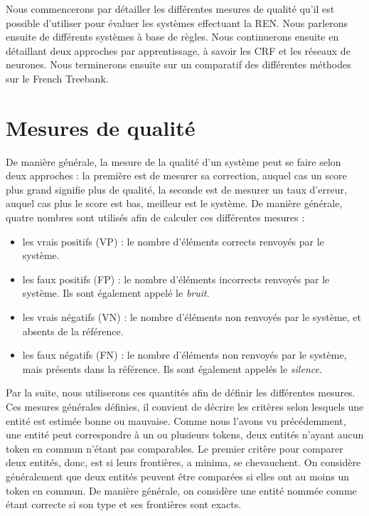 \documentclass[12pt,a4paper,times,twoside,openright]{report}
\begin{document}
Nous commencerons par détailler les différentes mesures de qualité qu'il est possible d'utiliser pour évaluer les systèmes effectuant la REN. Nous parlerons ensuite de différents systèmes à base de règles. Nous continuerons ensuite en détaillant deux approches par apprentissage, à savoir les CRF et les réseaux de neurones. Nous terminerons ensuite sur un comparatif des différentes méthodes sur le French Treebank.


    
    \section{Mesures de qualité}
    \label{sec:NER-quality-measurement}
De manière générale, la mesure de la qualité d'un système peut se faire selon deux approches : la première est de mesurer sa correction, auquel cas un score plus grand signifie plus de qualité, la seconde est de mesurer un taux d'erreur, auquel cas plus le score est bas, meilleur est le système. De manière générale, quatre nombres sont utilisés afin de calculer ces différentes mesures :

\begin{itemize}
\item les vrais positifs (VP) : le nombre d'éléments corrects renvoyés par le système.
\item les faux positifs (FP) : le nombre d'éléments incorrects renvoyés par le système. Ils sont également appelé le \emph{bruit}.
\item les vrais négatifs (VN) : le nombre d'éléments non renvoyés par le système, et absents de la référence.
\item les faux négatifs (FN) : le nombre d'éléments non renvoyés par le système, mais présents dans la référence. Ils sont également appelés le \emph{silence}.
\end{itemize}

Par la suite, nous utiliserons ces quantités afin de définir les différentes mesures. Ces mesures générales définies, il convient de décrire les critères selon lesquels une entité est estimée bonne ou mauvaise. Comme nous l'avons vu précédemment, une entité peut correspondre à un ou plusieurs tokens, deux entités n'ayant aucun token en commun n'étant pas comparables. Le premier critère pour comparer deux entités, donc, est si leurs frontières, a minima, se chevauchent. On considère généralement que deux entités peuvent être comparées si elles ont au moins un token en commun. De manière générale, on considère une entité nommée comme étant correcte si son type et ses frontières sont exacts.
\end{document}
